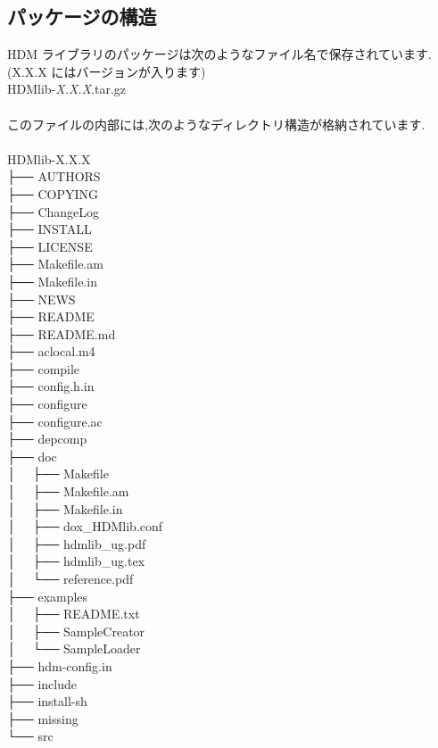 \documentclass[twoside]{jbook}
\begin{document}
\subsection{パッケージの構造}
HDM ライブラリのパッケージは次のようなファイル名で保存されています. \\
(X.X.X にはバージョンが入ります)\\
{\sf HDMlib-{\it X.X.X}.tar.gz}\\\\
このファイルの内部には,次のようなディレクトリ構造が格納されています. \\\\
{\sf
{\small
HDMlib-X.X.X \\
├── AUTHORS \\
├── COPYING \\
├── ChangeLog \\
├── INSTALL \\
├── LICENSE \\
├── Makefile.am \\
├── Makefile.in \\
├── NEWS \\
├── README \\
├── README.md \\
├── aclocal.m4 \\
├── compile \\
├── config.h.in \\
├── configure \\
├── configure.ac \\
├── depcomp \\
├── doc \\
│   ├── Makefile \\
│   ├── Makefile.am \\
│   ├── Makefile.in \\
│   ├── dox\_HDMlib.conf \\
│   ├── hdmlib\_ug.pdf \\
│   ├── hdmlib\_ug.tex \\
│   └── reference.pdf \\
├── examples \\
│   ├── README.txt \\
│   ├── SampleCreator \\
│   └── SampleLoader \\
├── hdm-config.in \\
├── include \\
├── install-sh \\
├── missing \\
└── src \\
}
}
\end{document}

